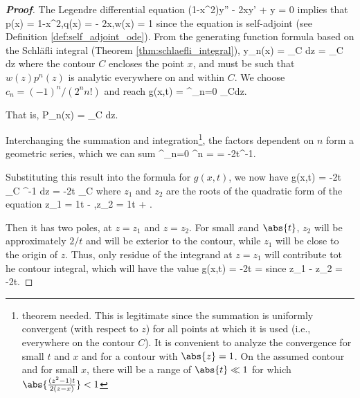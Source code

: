\begin{proof}[\bf Proof]
The Legendre differential equation
\be
(1-x^2)y'' - 2xy' + \lm y = 0
\ee
implies that
\be
p(x) = 1-x^2,\quad q(x) = - 2x,\quad w(x) = 1
\ee
since the equation is self-adjoint (see Definition \ref{def:self_adjoint_ode}). From the generating function formula based on the Schl\"afli integral (Theorem \ref{thm:schlaefli_integral}),
\be
y_n(x) =  \oint_C dz =  \oint_C dz
\ee
where the contour $C$ encloses the point $x$, and must be such that $w(z)p^n(z)$ is analytic everywhere on and within $C$. We choose $c_n = (-1)^n/(2^nn!)$ and reach
\be
g(x,t) = \sum^\infty_{n=0}  \oint_Cdz.
\ee

That is,
\be
P_n(x) =  \oint_C dz.
\ee

Interchanging the summation and integration\footnote{theorem needed. This is legitimate since the summation is uniformly convergent (with respect to $z$) for all points at which it is used (i.e., everywhere on the contour $C$). It is convenient to analyze the convergence for small $t$ and $x$ and for a contour with $\abs{z}=1$. On the assumed contour and for small $x$, there will be a range of $\abs{t}\ll 1$ for which $\abs{\frac{(z^2-1)t}{2(z-x)}}<1$}, the factors dependent on $n$ form a geometric series, which we can sum
\be
\sum^\infty_{n=0} ^n  =  = -\frac 2t^{-1}.
\ee

Substituting this result into the formula for $g(x,t)$, we now have
\be
g(x,t) = -\frac 2t  \oint_C ^{-1} dz = -\frac 2t  \oint_C 
\ee
where $z_1$ and $z_2$ are the roots of the quadratic form of the equation
\be
z_1 = \frac 1t - ,\quad z_2 = \frac 1t + .
\ee

Then it has two poles, at $z=z_1$ and $z=z_2$. For small $x$and $\abs{t}$, $z_2$ will be approximately $2/t$ and will be exterior to the contour, while $z_1$ will be close to the origin of $z$. Thus, only residue of the integrand at $z=z_1$ will contribute tot he contour integral, which will have the value
\be
g(x,t) = -\frac 2t  = 
\ee
since
\be
z_1 - z_2 = -\frac 2t.
\ee
\end{proof}


